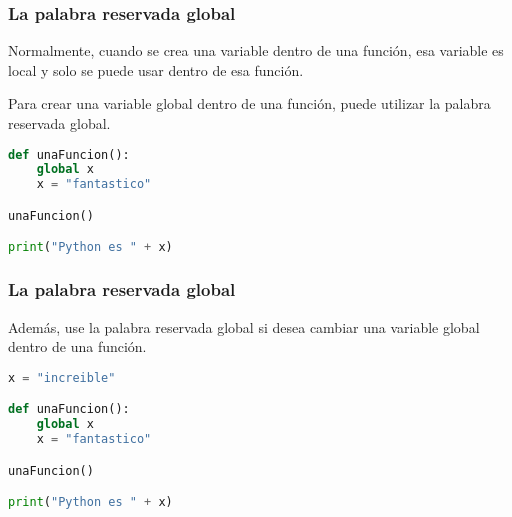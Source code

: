 \begin{frame}[fragile]
  \frametitle{La palabra reservada \textbf{global}}

  Normalmente, cuando se crea una variable dentro de una función, esa
  variable es local y solo se puede usar dentro de esa función.

  \vspace{\baselineskip}
  Para crear una variable global dentro de una función, puede utilizar
  la palabra reservada \textcolor{codeKeyword}{global}.

  \vspace{\baselineskip}
  \begin{lstlisting}[language=Python]
def unaFuncion():
    global x
    x = "fantastico"

unaFuncion()

print("Python es " + x)
  \end{lstlisting}
\end{frame}

\begin{frame}[fragile]
  \frametitle{La palabra reservada \textbf{global}}

  Además, use la palabra reservada \textcolor{codeKeyword}{global} si desea
  cambiar una variable global dentro de una función.

  \vspace{\baselineskip}
  \begin{lstlisting}[language=Python]
x = "increible"

def unaFuncion():
    global x
    x = "fantastico"

unaFuncion()

print("Python es " + x)
  \end{lstlisting}
\end{frame}

